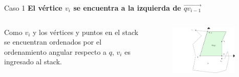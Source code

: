 \documentclass[aspectratio=169,xcolor=dvipsnames, t]{beamer}
\begin{document}
\begin{frame}{Caso 1}
    \textbf{El vértice $v_{i}$ se encuentra a la izquierda de $\overrightarrow{qv_{i-1}}$}\\
    \vspace{0.5cm}
    \begin{columns}
    \begin{column}{0.45\textwidth}
        Como $v_{i}$ y los vértices y puntos en el stack se encuentran ordenados por el ordenamiento  angular respecto a $q$, $v_{i}$ es ingresado al stack.
    \end{column}
    \begin{column}{0.45\textwidth}  %
    \vspace{-1.5cm} %
        \begin{figure}
            \centering
            \includegraphics[width=0.9\textwidth]{imagenes/Caso2.4a.png}
        \end{figure}
    \end{column}
    \end{columns}
\end{frame}

\end{document}
